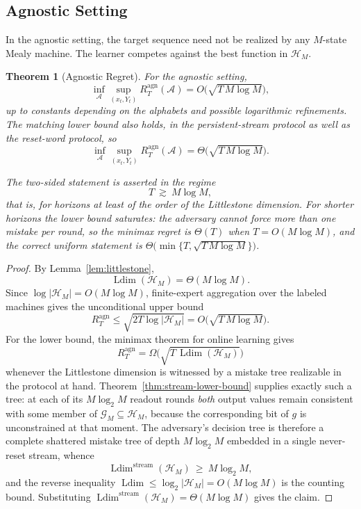 \documentclass[12pt]{article}
\newtheorem{theorem}{Theorem}[section]
\theoremstyle{definition}
\DeclareMathOperator{\Ldim}{Ldim}
\begin{document}
\subsection{Agnostic Setting}
\label{subsec:agnostic}

In the agnostic setting, the target sequence need not be realized by any
$M$-state Mealy machine.  The learner competes against the best function in
$\mathcal H_M$.

\begin{theorem}[Agnostic Regret]
\label{thm:agnostic}
For the agnostic setting,
\[
\inf_{\mathcal A}
\sup_{(x_t,Y_t)}
R_T^{\mathrm{agn}}(\mathcal A)
=
O\bigl(\sqrt{T\,M\log M}\bigr),
\]
up to constants depending on the alphabets and possible logarithmic
refinements.  The matching lower bound also holds, in the persistent-stream
protocol as well as the reset-word protocol, so
\[
\inf_{\mathcal A}
\sup_{(x_t,Y_t)}
R_T^{\mathrm{agn}}(\mathcal A)
=
\Theta\bigl(\sqrt{T\,M\log M}\bigr).
\]

The two-sided statement is asserted in the regime
\[
T\ \gtrsim\ M\log M ,
\]
that is, for horizons at least of the order of the Littlestone dimension.  For
shorter horizons the lower bound saturates: the adversary cannot force more
than one mistake per round, so the minimax regret is $\Theta(T)$ when
$T=O(M\log M)$, and the correct uniform statement is
$\Theta\bigl(\min\{T,\sqrt{T\,M\log M}\}\bigr)$.
\end{theorem}

\begin{proof}
By Lemma~\ref{lem:littlestone},
\[
\Ldim(\mathcal H_M)=\Theta(M\log M).
\]
Since $\log|\mathcal H_M|=O(M\log M)$, finite-expert aggregation over the
labeled machines gives the unconditional upper bound
\[
R_T^{\mathrm{agn}}
\le
\sqrt{2T\log|\mathcal H_M|}
=
O\bigl(\sqrt{T\,M\log M}\bigr).
\]
For the lower bound, the minimax theorem for online learning
\cite{bendavid2009,daniely2014} gives
\[
R_T^{\mathrm{agn}}=\Omega\bigl(\sqrt{T\,\Ldim(\mathcal H_M)}\bigr)
\]
whenever the Littlestone dimension is witnessed by a mistake tree realizable in the
protocol at hand.  Theorem~\ref{thm:stream-lower-bound} supplies exactly such
a tree: at each of its $M\log_2M$ readout rounds \emph{both} output values
remain consistent with some member of $\mathcal G_M\subseteq\mathcal H_M$,
because the corresponding bit of $g$ is unconstrained at that moment.  The
adversary's decision tree is therefore a complete shattered mistake tree of
depth $M\log_2M$ embedded in a single never-reset stream, whence
\[
\Ldim^{\mathrm{stream}}(\mathcal H_M)\ \ge\ M\log_2M,
\]
and the reverse inequality $\Ldim\le\log_2|\mathcal H_M|=O(M\log M)$ is the
counting bound.  Substituting
$\Ldim^{\mathrm{stream}}(\mathcal H_M)=\Theta(M\log M)$ gives the claim.
\end{proof}
\end{document}
